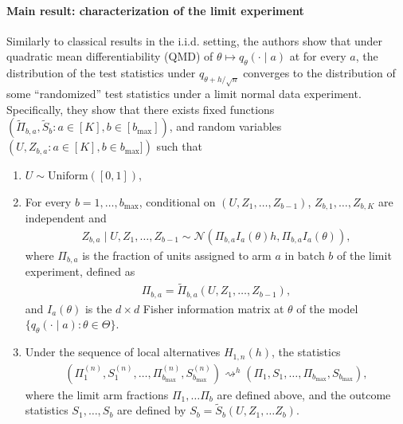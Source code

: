 \paragraph{Main result: characterization of the limit experiment} Similarly to classical results in the i.i.d. setting, the authors show that under quadratic mean differentiability (QMD) of $\theta \mapsto q_\theta(\cdot \mid a)$ at for every $a$, the distribution of the test statistics under $q_{\theta + h / \sqrt{n}}$ converges to the distribution of some ``randomized'' test statistics under a limit normal data experiment. Specifically, they show that there exists fixed functions $(\widetilde{\Pi}_{b,a}, \widetilde{S}_b: a \in [K], b \in [b_{\max}])$, and random variables $(U, Z_{b,a} : a \in [K], b \in b_{\max}])$ such that
\begin{enumerate}
    \item $U \sim \mathrm{Uniform}([0,1])$,
    \item For every $b=1,\ldots,b_{\max}$, conditional on $(U, Z_1,\ldots, Z_{b-1})$, $Z_{b,1},\ldots, Z_{b,K}$ are independent and
    \begin{align*}
        Z_{b,a} \mid U, Z_{1}, \ldots, Z_{b-1} \sim \mathcal{N}(\Pi_{b,a}  I_a(\theta) h, \Pi_{b,a}  I_a(\theta)),
    \end{align*}
    where $\Pi_{b,a}$ is the fraction of units assigned to arm $a$ in batch $b$ of the limit experiment, defined as 
    \begin{align*}
        \Pi_{b,a} = \widetilde \Pi_{b,a}(U,Z_1,\ldots,Z_{b-1}),
    \end{align*}
    and $I_a(\theta)$ is the $d \times d$ Fisher information matrix at $\theta$ of the model $\{q_\theta(\cdot \mid a) : \theta \in \Theta\}$.
    \item Under the sequence of local alternatives $H_{1,n}(h)$, the statistics
    \begin{align*}
        (\Pi_{1}^{(n)}, S_1^{(n)}, \ldots, \Pi_{b_{\max}}^{(n)}, S_{b_{\max}}^{(n)}) \rightsquigarrow^{h} (\Pi_1, S_1, \ldots, \Pi_{b_{\max}}, S_{b_{\max}}),
    \end{align*}
    where the limit arm fractions $\Pi_1,\ldots \Pi_b$ are defined above, and the outcome statistics $S_1,\ldots, S_b$ are defined by $S_{b} = \widetilde S_{b}(U,Z_1, \ldots Z_b)$.
\end{enumerate}
